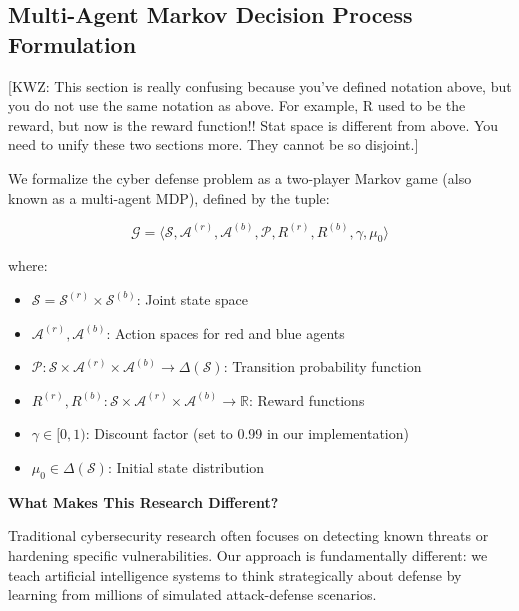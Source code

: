 \documentclass[12pt,oneside]{article}
\newcommand{\kwz}[1]{
  {\color{magenta} [KWZ: {#1}]}
 }
\begin{document}
\subsection{Multi-Agent Markov Decision Process Formulation}

\kwz{This section is really confusing because you've defined notation above, but you do not use the same notation as above. For example, R used to be the reward, but now is the reward function!! Stat space is different from above. You need to unify these two sections more. They cannot be so disjoint.}

We formalize the cyber defense problem as a two-player Markov game (also known as a multi-agent MDP), defined by the tuple:

$$\mathcal{G} = \langle \mathcal{S}, \mathcal{A}^{(r)}, \mathcal{A}^{(b)}, \mathcal{P}, R^{(r)}, R^{(b)}, \gamma, \mu_0 \rangle$$

where:
\begin{itemize}
    \item $\mathcal{S} = \mathcal{S}^{(r)} \times \mathcal{S}^{(b)}$: Joint state space
    \item $\mathcal{A}^{(r)}, \mathcal{A}^{(b)}$: Action spaces for red and blue agents
    \item $\mathcal{P}: \mathcal{S} \times \mathcal{A}^{(r)} \times \mathcal{A}^{(b)} \to \Delta(\mathcal{S})$: Transition probability function
    \item $R^{(r)}, R^{(b)}: \mathcal{S} \times \mathcal{A}^{(r)} \times \mathcal{A}^{(b)} \to \mathbb{R}$: Reward functions
    \item $\gamma \in [0,1)$: Discount factor (set to 0.99 in our implementation)
    \item $\mu_0 \in \Delta(\mathcal{S})$: Initial state distribution
\end{itemize}

\textbf{What Makes This Research Different?}

Traditional cybersecurity research often focuses on detecting known threats or hardening specific vulnerabilities. Our approach is fundamentally different: we teach artificial intelligence systems to think strategically about defense by learning from millions of simulated attack-defense scenarios. 
\end{document}

